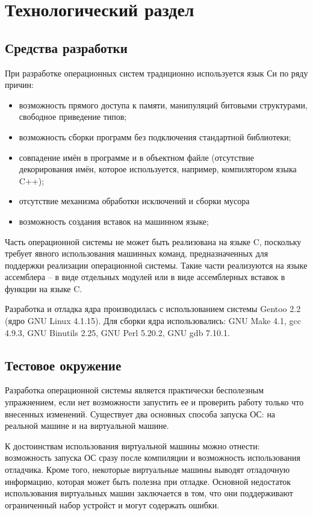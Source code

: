 \chapter{Технологический раздел}
\label{cha:impl}

\section{Средства разработки}
При разработке операционных систем традиционно используется язык Си по ряду причин:
\begin{itemize}
\item возможность прямого доступа к памяти, манипуляций битовыми
структурами, свободное приведение типов;
\item возможность сборки программ без подключения стандартной
библиотеки;
\item совпадение имён в программе и в объектном файле (отсутствие декорирования имён,
	которое используется, например, компилятором языка C++);
\item отсутствие механизма обработки исключений и сборки мусора
\item возможность создания вставок на машинном языке;
\end{itemize}

Часть операционной системы не может быть реализована на языке C, поскольку
требует явного использования машинных команд, предназначенных для поддержки
реализации операционной системы. Такие части реализуются на языке ассемблера
-- в виде отдельных модулей или в виде ассемблерных вставок в функции на
языке C.

Разработка и отладка ядра производилась с использованием системы Gentoo 2.2 (ядро
GNU Linux 4.1.15). Для сборки ядра использовались: GNU Make 4.1, gcc 4.9.3, GNU
Binutils 2.25, GNU Perl 5.20.2, GNU gdb 7.10.1.

\section{Тестовое окружение}
Разработка операционной системы является практически бесполезным упражнением,
если нет возможности запустить ее и проверить работу только что внесенных
изменений. Существует два основных способа запуска ОС: на реальной машине
и на виртуальной машине.

К достоинствам использования виртуальной машины можно отнести: возможность
запуска ОС сразу после компиляции и возможность использования отладчика. Кроме
того, некоторые виртуальные машины выводят отладочную информацию, которая
может быть полезна при отладке. Основной недостаток использования виртуальных
машин заключается в том, что они поддерживают ограниченный набор устройст и
могут содержать ошибки.

